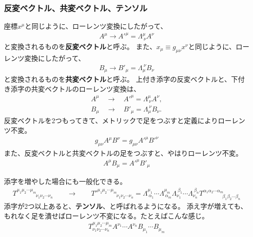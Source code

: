 \documentclass[10pt,a4paper]{jarticle}
\begin{document}
\subsubsection{反変ベクトル、共変ベクトル、テンソル}
座標$x^\mu$と同じように、ローレンツ変換にしたがって、
\begin{align}
A^\mu \to {A'}^\mu = \Lambda^\mu_{~\nu} A^\nu \label{eq:hanpen vector}
\end{align}
と変換されるものを\textbf{反変ベクトル}と呼ぶ。
また、$x_\mu \equiv g_{\mu\nu} x^\nu$と同じように、ローレンツ変換にしたがって、
\begin{align}
B_\mu \to {B'}_\mu = \Lambda_\mu^{~\nu} B_\nu \label{eq:kyohen vector}
\end{align}
と変換されるものを\textbf{共変ベクトル}と呼ぶ。
%
上付き添字の反変ベクトルと、下付き添字の共変ベクトルのローレンツ変換は、
\begin{align}
A^\mu \quad\to\quad {A'}^\mu = \Lambda^\mu_{~\nu} A^\nu, \\
B_\mu \quad\to\quad {B'}_\mu = \Lambda_\mu^{~\nu} B_\nu.
\end{align}
%
反変ベクトルを2つもってきて、メトリックで足をつぶすと定義によりローレンツ不変。
\begin{align}
g_{\mu\nu} A^\mu B^\nu = g_{\mu\nu} {A'}^\mu {B'}^\nu
\end{align}
また、反変ベクトルと共変ベクトルの足をつぶすと、やはりローレンツ不変。
\begin{align}
A^\mu B_\mu = {A'}^\mu {B'}_\mu
\end{align}

添字を増やした場合にも一般化できる。
\begin{align}
T^{\mu_1 \mu_2 \cdots \mu_m}_{\qquad\qquad\nu_1 \nu_2 \cdots \nu_n}
\qquad\to\qquad
{T'}^{\mu_1 \mu_2 \cdots \mu_m}_{\qquad\qquad\nu_1 \nu_2 \cdots \nu_n}
=
\Lambda^{\mu_1}_{~\alpha_1}
\cdots
\Lambda^{\mu_m}_{~\alpha_m}
\Lambda_{\nu_1}^{~\beta_1}
\cdots
\Lambda_{\nu_n}^{~\beta_n}
{T}^{\alpha_1 \alpha_2 \cdots \alpha_m}_{\qquad\qquad\beta_1 \beta_2 \cdots \beta_n}
\end{align}
添字が2つ以上あると、\textbf{テンソル}、と呼ばれるようになる。
添え字が増えても、もれなく足を潰せばローレンツ不変になる。たとえばこんな感じ。
\begin{align}
T^{\mu_1 \mu_2 \cdots \mu_m}_{\nu_1 \nu_2 \cdots \nu_n}
A^{\nu_1} \cdots A^{\nu_n} B_{\mu_1} \cdots B_{\mu_m}
\end{align}
\end{document}
